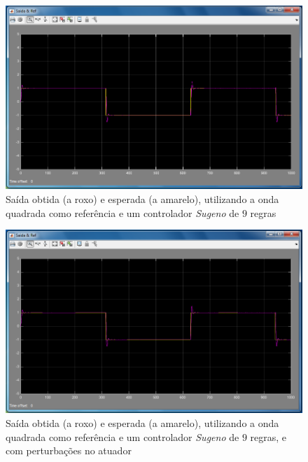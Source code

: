 \documentclass{article}
\begin{document}
\clearpage


\begin{figure}[h]
  \centering
      \includegraphics[scale=0.3]{Images/Sugeno_9_square.png}
  \caption{Saída obtida (a roxo) e esperada (a amarelo), utilizando a onda quadrada como referência e um controlador \emph{Sugeno} de $9$ regras}
\end{figure}

\begin{figure}[h]
  \centering
      \includegraphics[scale=0.3]{Images/Sugeno_9_square_actuator.png}
  \caption{Saída obtida (a roxo) e esperada (a amarelo), utilizando a onda quadrada como referência e um controlador \emph{Sugeno} de $9$ regras, e com perturbações no atuador}
\end{figure}
\end{document}

